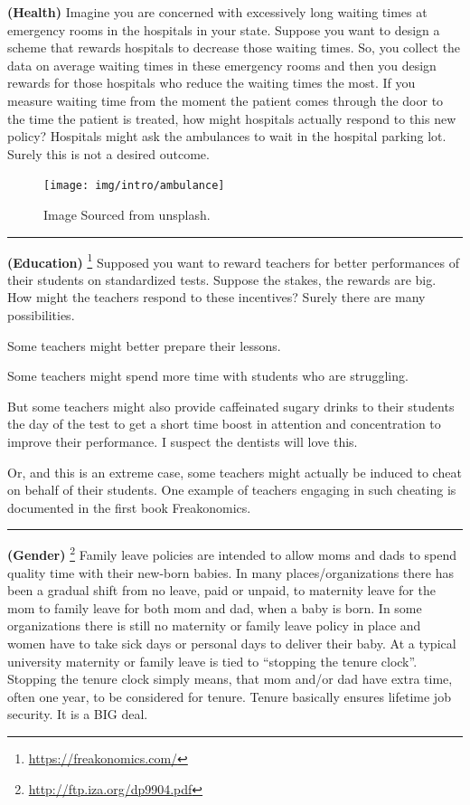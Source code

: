 \documentclass[
]{book}
\begin{document}
\textbf{(Health)} Imagine you are concerned with excessively long waiting times at emergency rooms in the hospitals in your state. Suppose you want to design a scheme that rewards hospitals to decrease those waiting times. So, you collect the data on average waiting times in these emergency rooms and then you design rewards for those hospitals who reduce the waiting times the most. If you measure waiting time from the moment the patient comes through the door to the time the patient is treated, how might hospitals actually respond to this new policy?
Hospitals might ask the ambulances to wait in the hospital parking lot. Surely this is not a desired outcome.

\begin{figure}

{\centering \texttt{[image: img/intro/ambulance]} 

}

\caption{Image Sourced from unsplash.}\label{fig:introambulance}
\end{figure}

\begin{center}\rule{0.5\linewidth}{0.5pt}\end{center}

\textbf{(Education)} \footnote{\url{https://freakonomics.com/}} Supposed you want to reward teachers for better performances of their students on standardized tests. Suppose the stakes, the rewards are big. How might the teachers respond to these incentives? Surely there are many possibilities.

Some teachers might better prepare their lessons.

Some teachers might spend more time with students who are struggling.

But some teachers might also provide caffeinated sugary drinks to their students the day of the test to get a short time boost in attention and concentration to improve their performance. I suspect the dentists will love this.

Or, and this is an extreme case, some teachers might actually be induced to cheat on behalf of their students. One example of teachers engaging in such cheating is documented in the first book Freakonomics.

\begin{center}\rule{0.5\linewidth}{0.5pt}\end{center}

\textbf{(Gender)} \footnote{\url{http://ftp.iza.org/dp9904.pdf}} Family leave policies are intended to allow moms and dads to spend quality time with their new-born babies. In many places/organizations there has been a gradual shift from no leave, paid or unpaid, to maternity leave for the mom to family leave for both mom and dad, when a baby is born. In some organizations there is still no maternity or family leave policy in place and women have to take sick days or personal days to deliver their baby. At a typical university maternity or family leave is tied to ``stopping the tenure clock''. Stopping the tenure clock simply means, that mom and/or dad have extra time, often one year, to be considered for tenure. Tenure basically ensures lifetime job security. It is a BIG deal.
\end{document}

